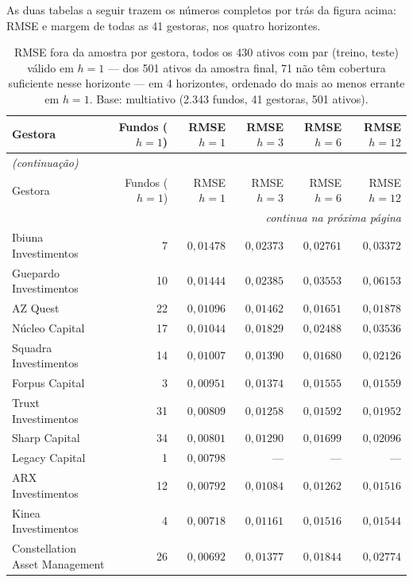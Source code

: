\documentclass[11pt,a4paper]{article}
\begin{document}
As duas tabelas a seguir trazem os números completos por trás da figura acima: RMSE e margem de
todas as 41 gestoras, nos quatro horizontes.

\begin{center}\scriptsize
\begin{longtable}{@{}lrrrrr@{}}
\caption{RMSE fora da amostra por gestora, todos os 430 ativos com par (treino, teste) válido
em $h=1$ --- dos 501 ativos da amostra final, 71 não têm cobertura suficiente nesse horizonte
--- em 4 horizontes, ordenado do mais ao menos errante em $h=1$. Base: multiativo (2.343 fundos,
41 gestoras, 501 ativos).}
\label{tab:rmse-gestora}\\
\toprule
Gestora & Fundos ($h{=}1$) & RMSE $h{=}1$ & RMSE $h{=}3$ & RMSE $h{=}6$ & RMSE $h{=}12$ \\
\midrule
\endfirsthead
\multicolumn{6}{l}{\textit{(continuação)}}\\
\toprule
Gestora & Fundos ($h{=}1$) & RMSE $h{=}1$ & RMSE $h{=}3$ & RMSE $h{=}6$ & RMSE $h{=}12$ \\
\midrule
\endhead
\midrule
\multicolumn{6}{r}{\textit{continua na próxima página}}\\
\endfoot
\bottomrule
\endlastfoot
Ibiuna Investimentos & 7 & $0{,}01478$ & $0{,}02373$ & $0{,}02761$ & $0{,}03372$ \\
Guepardo Investimentos & 10 & $0{,}01444$ & $0{,}02385$ & $0{,}03553$ & $0{,}06153$ \\
AZ Quest & 22 & $0{,}01096$ & $0{,}01462$ & $0{,}01651$ & $0{,}01878$ \\
Núcleo Capital & 17 & $0{,}01044$ & $0{,}01829$ & $0{,}02488$ & $0{,}03536$ \\
Squadra Investimentos & 14 & $0{,}01007$ & $0{,}01390$ & $0{,}01680$ & $0{,}02126$ \\
Forpus Capital & 3 & $0{,}00951$ & $0{,}01374$ & $0{,}01555$ & $0{,}01559$ \\
Truxt Investimentos & 31 & $0{,}00809$ & $0{,}01258$ & $0{,}01592$ & $0{,}01952$ \\
Sharp Capital & 34 & $0{,}00801$ & $0{,}01290$ & $0{,}01699$ & $0{,}02096$ \\
Legacy Capital & 1 & $0{,}00798$ & --- & --- & --- \\
ARX Investimentos & 12 & $0{,}00792$ & $0{,}01084$ & $0{,}01262$ & $0{,}01516$ \\
Kinea Investimentos & 4 & $0{,}00718$ & $0{,}01161$ & $0{,}01516$ & $0{,}01544$ \\
Constellation Asset Management & 26 & $0{,}00692$ & $0{,}01377$ & $0{,}01844$ & $0{,}02774$ \\

\end{longtable}
\end{center}
\end{document}
